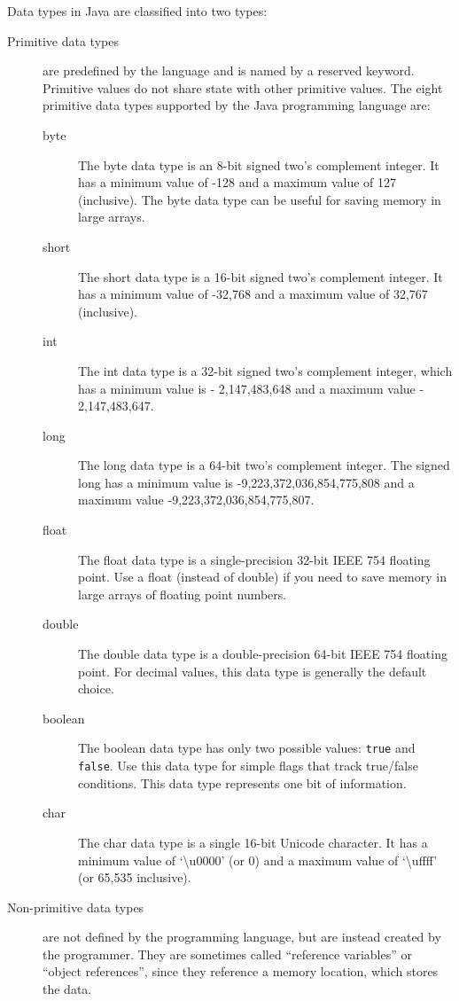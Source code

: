 \documentclass[11pt,a4paper]{article}
\begin{document}
Data types in Java are classified into two types:
\begin{description}
\item [Primitive data types] are predefined by the language and is named by a reserved keyword. Primitive values do not share state with other primitive values. The eight primitive data types supported by the Java programming language are:
\begin{description}
\item [byte] The byte data type is an 8-bit signed two's complement integer. It has a minimum value of -128 and a maximum value of 127 (inclusive). The byte data type can be useful for saving memory in large arrays.
\item [short] The short data type is a 16-bit signed two's complement integer. It has a minimum value of -32,768 and a maximum value of 32,767 (inclusive).
\item [int] The int data type is a 32-bit signed two's complement integer, which has a minimum value is - 2,147,483,648 and a maximum value - 2,147,483,647. 
\item [long] The long data type is a 64-bit two's complement integer. The signed long has a minimum value is  -9,223,372,036,854,775,808 and a maximum value  -9,223,372,036,854,775,807.
\item [float] The float data type is a single-precision 32-bit IEEE 754 floating point. Use a float (instead of double) if you need to save memory in large arrays of floating point numbers. 
\item [double] The double data type is a double-precision 64-bit IEEE 754 floating point. For decimal values, this data type is generally the default choice. 
\item [boolean] The boolean data type has only two possible values: \lstinline!true! and \lstinline!false!. Use this data type for simple flags that track true/false conditions. This data type represents one bit of information.
\item [char] The char data type is a single 16-bit Unicode character. It has a minimum value of `\textbackslash u0000' (or 0) and a maximum value of `\textbackslash uffff' (or 65,535 inclusive).
\end{description}
\item [Non-primitive data types] are not defined by the programming language, but are instead created by the programmer. They are sometimes called ``reference variables'' or ``object references'', since they reference a memory location, which stores the data.

\end{description}
\end{document}
